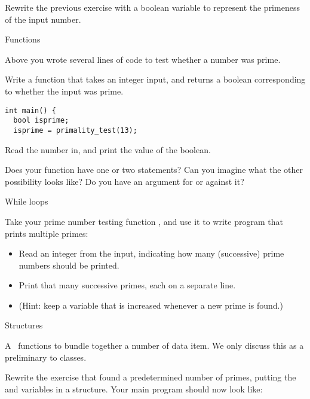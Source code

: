 \begin{exercise}
  \label{ex:prime:test2}
  Rewrite the previous exercise with a boolean variable to represent
  the primeness of the input number.
\end{exercise}

 {Functions}

\prerequisite{\ref{ch:function}}

Above you wrote several lines of code to test whether a number was
prime.

\begin{exercise}
  \label{ex:prime:func}
  Write a function  that takes an integer input, and returns a boolean
  corresponding to whether the input was prime.
\begin{verbatim}
int main() {
  bool isprime;
  isprime = primality_test(13);
\end{verbatim}
  Read the number in, and print the value of the boolean.

  Does your function have one or two  statements?
  Can you imagine what the other possibility looks like?
  Do you have an argument for or against it?
\end{exercise}

 {While loops}

\prerequisite{\ref{sec:loopuntil}}

\begin{exercise}
  \label{ex:prime:while}
  Take your prime number testing function , and use it to
  write program that prints multiple primes:
  \begin{itemize}
  \item Read an integer  from the input, indicating how
    many (successive) prime numbers should be printed.
  \item Print that many successive primes, each on a separate line.
  \item (Hint: keep a variable
     that is increased whenever a new prime is found.)
  \end{itemize}
\end{exercise}

 {Structures}

\prerequisite{\ref{sec:struct}, \ref{sec:reference}}

A~ functions to bundle together a number of data item. We
only discuss this as a preliminary to classes.

\begin{exercise}
  \label{ex:prime:struct}
  Rewrite the exercise that found a predetermined number of primes,
  putting the  and
   variables in a structure. Your main program should
  now look like:
\end{exercise}

